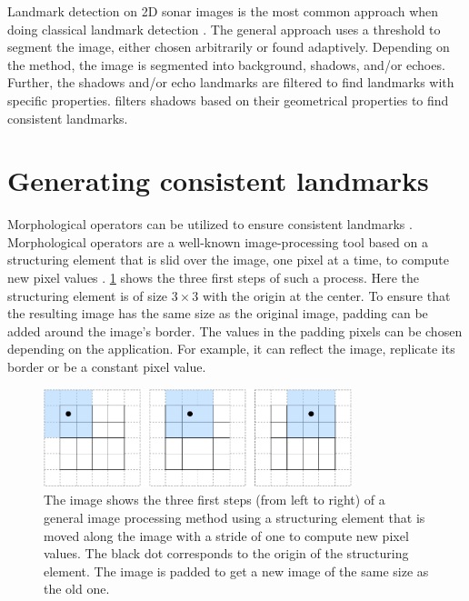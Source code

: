 Landmark detection on 2D sonar images is the most common approach when doing classical landmark detection \cite{Wang2017UnderwaterSonar, Siantidis2016SideVehicles, Yuan2016AnNavigation, Leblond2019SonarProject}. The general approach uses a threshold to segment the image, either chosen arbitrarily or found adaptively. Depending on the method, the image is segmented into background, shadows, and/or echoes. Further, the shadows and/or echo landmarks are filtered to find landmarks with specific properties. \cite{Leblond2019SonarProject} filters shadows based on their geometrical properties to find consistent landmarks. 

\section{Generating consistent landmarks}

Morphological operators can be utilized to ensure consistent landmarks \cite{Yuan2016AnNavigation}. Morphological operators are a well-known image-processing tool based on a structuring element that is slid over the image, one pixel at a time, to compute new pixel values \cite{Gonzalez2018DigitalProcessing}. \cref{fig:image_processing_basics} shows the three first steps of such a process. Here the structuring element is of size $3\times3$ with the origin at the center. To ensure that the resulting image has the same size as the original image, padding can be added around the image's border. The values in the padding pixels can be chosen depending on the application. For example, it can reflect the image, replicate its border or be a constant pixel value.  

\begin{figure}
    \centering
    \includegraphics[width=0.8\textwidth]{figures/Image_processing_essentials.drawio.pdf}
    \caption{The image shows the three first steps (from left to right) of a general image processing method using a structuring element that is moved along the image with a stride of one to compute new pixel values. The black dot corresponds to the origin of the structuring element. The image is padded to get a new image of the same size as the old one.}
    \label{fig:image_processing_basics}
\end{figure}

